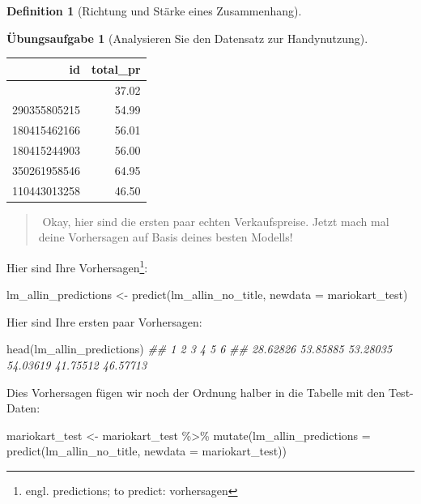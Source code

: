 \documentclass[
  a4paper,
  DIV=11]{scrreprt}
\newenvironment{Shaded}{\begin{snugshade}}{\end{snugshade}}
\newcommand{\AttributeTok}[1]{\textcolor[rgb]{0.40,0.45,0.13}{#1}}
\newcommand{\DocumentationTok}[1]{\textcolor[rgb]{0.37,0.37,0.37}{\textit{#1}}}
\newcommand{\FunctionTok}[1]{\textcolor[rgb]{0.28,0.35,0.67}{#1}}
\newcommand{\NormalTok}[1]{\textcolor[rgb]{0.00,0.23,0.31}{#1}}
\newcommand{\OtherTok}[1]{\textcolor[rgb]{0.00,0.23,0.31}{#1}}
\newcommand{\SpecialCharTok}[1]{\textcolor[rgb]{0.37,0.37,0.37}{#1}}
\theoremstyle{definition}
\newtheorem{exercise}{Übungsaufgabe}[chapter]
\theoremstyle{definition}
\theoremstyle{definition}
\newtheorem{definition}{Definition}[chapter]
\theoremstyle{remark}
\begin{document}
\begin{definition}[Richtung und Stärke eines
Zusammenhang]
\begin{exercise}[Analysieren Sie den Datensatz zur
Handynutzung]
\begin{longtable}[]{@{}rr@{}}
\toprule\noalign{}
id & total\_pr \\
\midrule\noalign{}
\endhead
\bottomrule\noalign{}
\endlastfoot
120477729093 & 37.02 \\
290355805215 & 54.99 \\
180415462166 & 56.01 \\
180415244903 & 56.00 \\
350261958546 & 64.95 \\
110443013258 & 46.50 \\
\end{longtable}

\begin{quote}
{}️ Okay, hier sind die ersten paar echten Verkaufspreise.
Jetzt mach mal deine Vorhersagen auf Basis deines besten Modells!
\end{quote}

Hier sind Ihre Vorhersagen\footnote{engl. predictions; to predict:
  vorhersagen}:

\begin{Shaded}
\begin{Highlighting}[]
\NormalTok{lm\_allin\_predictions }\OtherTok{\textless{}{-}} \FunctionTok{predict}\NormalTok{(lm\_allin\_no\_title, }\AttributeTok{newdata =}\NormalTok{ mariokart\_test)}
\end{Highlighting}
\end{Shaded}

Hier sind Ihre ersten paar Vorhersagen:

\begin{Shaded}
\begin{Highlighting}[]
\FunctionTok{head}\NormalTok{(lm\_allin\_predictions)}
\DocumentationTok{\#\#        1        2        3        4        5        6 }
\DocumentationTok{\#\# 28.62826 53.85885 53.28035 54.03619 41.75512 46.57713}
\end{Highlighting}
\end{Shaded}

Dies Vorhersagen fügen wir noch der Ordnung halber in die Tabelle mit
den Test-Daten:

\begin{Shaded}
\begin{Highlighting}[]
\NormalTok{mariokart\_test }\OtherTok{\textless{}{-}}
\NormalTok{  mariokart\_test }\SpecialCharTok{\%\textgreater{}\%} 
  \FunctionTok{mutate}\NormalTok{(}\AttributeTok{lm\_allin\_predictions =} \FunctionTok{predict}\NormalTok{(lm\_allin\_no\_title, }\AttributeTok{newdata =}\NormalTok{ mariokart\_test))}
\end{Highlighting}
\end{Shaded}


\end{exercise}
\end{definition}
\end{document}
